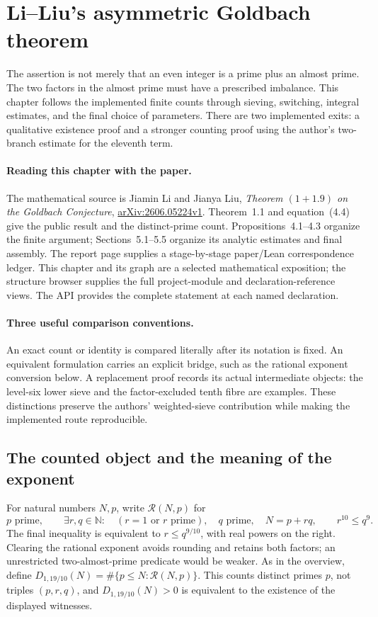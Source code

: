 \section{Li--Liu's asymmetric Goldbach theorem}
\label{sec:liliu-mathematical-chain}

The assertion is not merely that an even integer is a prime plus an
almost prime.  The two factors in the almost prime must have a prescribed
imbalance.  This chapter follows the implemented finite counts through
sieving, switching, integral estimates, and the final choice of parameters.
There are two implemented exits: a qualitative existence proof and a stronger
counting proof using the author's two-branch estimate for the eleventh term.


\paragraph{Reading this chapter with the paper.}
The mathematical source is Jiamin Li and Jianya Liu,
\emph{Theorem $(1+1.9)$ on the Goldbach Conjecture},
\href{https://arxiv.org/html/2606.05224v1}{arXiv:2606.05224v1}.
Theorem~1.1 and equation~(4.4) give the public result and the distinct-prime
count. Propositions~4.1--4.3 organize the finite argument; Sections~5.1--5.5
organize its analytic estimates and final assembly.
The report page supplies a stage-by-stage paper/Lean correspondence ledger.
This chapter and its graph are a selected mathematical exposition; the
structure browser supplies the full project-module and declaration-reference
views. The API provides the complete statement at each named declaration.

\paragraph{Three useful comparison conventions.}
An exact count or identity is compared literally after its notation is fixed.
An equivalent formulation carries an explicit bridge, such as the rational
exponent conversion below. A replacement proof records its actual intermediate
objects: the level-six lower sieve and the factor-excluded tenth fibre are
examples. These distinctions preserve the authors' weighted-sieve contribution
while making the implemented route reproducible.

\subsection{The counted object and the meaning of the exponent}
For natural numbers $N,p$, write $\mathcal R(N,p)$ for
\[
 p\text{ prime},\qquad \exists r,q\in\mathbb N:\quad
 (r=1\text{ or }r\text{ prime}),\quad q\text{ prime},\quad
 N=p+rq,\qquad r^{10}\le q^9.
\]
The final inequality is equivalent to $r\le q^{9/10}$, with real powers
on the right.  Clearing the rational exponent avoids rounding and retains
both factors; an unrestricted two-almost-prime predicate would be weaker.
As in the overview, define $D_{1,19/10}(N)=\#\{p\le N:\mathcal R(N,p)\}$.
This counts distinct primes $p$, not triples $(p,r,q)$, and
$D_{1,19/10}(N)>0$ is equivalent to the existence of the displayed witnesses.

